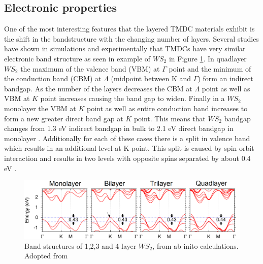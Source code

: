 \subsection{Electronic properties}
\label{subsec:Electronic properties}
	
One of the most interesting features that the layered TMDC materials exhibit is the shift in the bandstructure with the changing number of layers. Several studies have shown in simulations and experimentally that TMDCs have very similar electronic band structure as seen in example of $WS_2$ in Figure \ref{fig:WS2BandStructureSimulation}. In quadlayer $WS_2$ the maximum of the valence band (VBM) at $\Gamma$ point and the minimum of the conduction band (CBM) at $\Lambda$ (midpoint between K and $\Gamma$) form an indirect bandgap. As the number of the layers decreases the CBM at $\Lambda$ point as well as VBM at $K$ point increases causing the band gap to widen. Finally in a $WS_2$ monolayer the VBM at $K$ point as well as entire conduction band increases to form a new greater direct band gap at $K$ point. This means that $WS_2$ bandgap changes from 1.3 eV indirect bandgap in bulk to 2.1 eV direct bandgap in monolayer . Additionally for each of these cases there is a split in valence band which results in an additional level at K point. This split is caused by spin orbit interaction and results in two levels with opposite spins separated by about 0.4 eV \cite{Zeng2013}.
	
\begin{figure}[ht]
	\begin{center}
		\includegraphics[scale=0.24]{WS2BandStructureSimulation.png}
		\caption{\small Band structures of 1,2,3 and 4 layer $WS_2$, from ab inito calculations. Adopted from \cite{Zeng2013}}
		\label{fig:WS2BandStructureSimulation}
	\end{center}
\end{figure}
	
